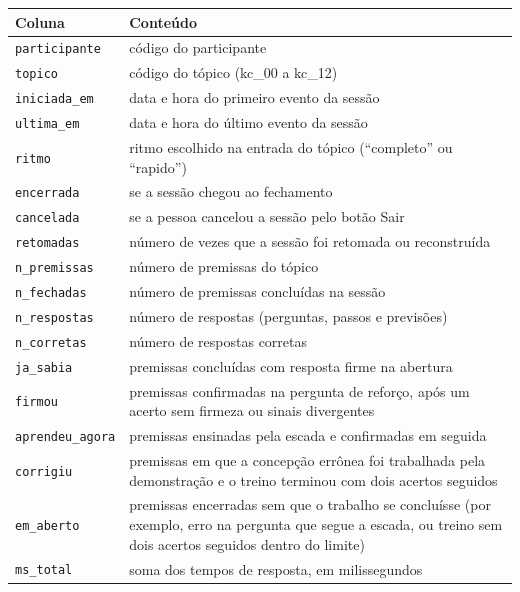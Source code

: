\begin{quadro}[htbp]
\caption{Colunas de \texttt{sessoes.csv}}\label{qua:C-1}
\footnotesize
\begin{tabularx}{\textwidth}{|X|X|}
\hline
\textbf{Coluna} & \textbf{Conteúdo} \\ \hline
\texttt{participante} & código do participante \\ \hline
\texttt{topico} & código do tópico (kc\_00 a kc\_12) \\ \hline
\texttt{iniciada\_em} & data e hora do primeiro evento da sessão \\ \hline
\texttt{ultima\_em} & data e hora do último evento da sessão \\ \hline
\texttt{ritmo} & ritmo escolhido na entrada do tópico (``completo'' ou ``rapido'') \\ \hline
\texttt{encerrada} & se a sessão chegou ao fechamento \\ \hline
\texttt{cancelada} & se a pessoa cancelou a sessão pelo botão Sair \\ \hline
\texttt{retomadas} & número de vezes que a sessão foi retomada ou reconstruída \\ \hline
\texttt{n\_premissas} & número de premissas do tópico \\ \hline
\texttt{n\_fechadas} & número de premissas concluídas na sessão \\ \hline
\texttt{n\_respostas} & número de respostas (perguntas, passos e previsões) \\ \hline
\texttt{n\_corretas} & número de respostas corretas \\ \hline
\texttt{ja\_sabia} & premissas concluídas com resposta firme na abertura \\ \hline
\texttt{firmou} & premissas confirmadas na pergunta de reforço, após um acerto sem firmeza ou sinais divergentes \\ \hline
\texttt{aprendeu\_agora} & premissas ensinadas pela escada e confirmadas em seguida \\ \hline
\texttt{corrigiu} & premissas em que a concepção errônea foi trabalhada pela demonstração e o treino terminou com dois acertos seguidos \\ \hline
\texttt{em\_aberto} & premissas encerradas sem que o trabalho se concluísse (por exemplo, erro na pergunta que segue a escada, ou treino sem dois acertos seguidos dentro do limite) \\ \hline
\texttt{ms\_total} & soma dos tempos de resposta, em milissegundos \\ \hline
\end{tabularx}
\end{quadro}

